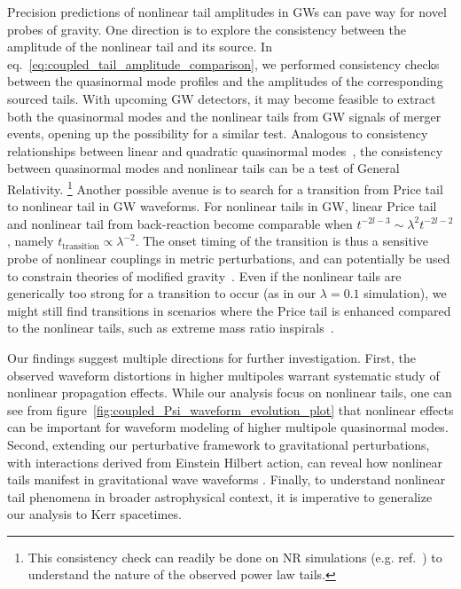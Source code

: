 \documentclass[reprint,aps,physrev,superscriptaddress,10pt,notitlepage,prd,nofootinbib,onecolumn]{revtex4-2}
\newcommand{\fref}[1]{figure~\ref{#1}}
\begin{document}
Precision predictions of nonlinear tail amplitudes in GWs can pave way for novel probes of gravity.
One direction is to explore the consistency between the amplitude of the nonlinear tail and its source.
In eq.~\eqref{eq:coupled_tail_amplitude_comparison}, we performed consistency checks between the quasinormal mode profiles and the amplitudes of the corresponding sourced tails.
With upcoming GW detectors, it may become feasible to extract both the quasinormal modes and the nonlinear tails from GW signals of merger events, opening up the possibility for a similar test.
Analogous to consistency relationships between linear and quadratic quasinormal modes~\cite{Khera:2023oyf,Khera:2024yrk,Cheung:2022rbm,Mitman:2022qdl,Ma:2024qcv,Perrone:2023jzq}, the consistency between quasinormal modes and nonlinear tails can be a test of General Relativity.
\footnote{This consistency check can readily be done on NR simulations (e.g. ref.~\cite{DeAmicis:2024eoy,Ma:2024hzq}) to understand the nature of the observed power law tails.}
Another possible avenue is to search for a transition from Price tail to nonlinear tail in GW waveforms.
For nonlinear tails in GW, linear Price tail and nonlinear tail from back-reaction become comparable when $t^{-2l-3} \sim \lambda^2 t^{-2l-2}$, namely $t_{\mathrm{transition}} \propto \lambda^{-2}$.
The onset timing of the transition is thus a sensitive probe of nonlinear couplings in metric perturbations, and can potentially be used to constrain theories of modified gravity~\cite{Berti:2015itd}.
Even if the nonlinear tails are generically too strong for a transition to occur (as in our $\lambda = 0.1$ simulation), we might still find transitions in scenarios where the Price tail is enhanced compared to the nonlinear tails, such as extreme mass ratio inspirals~\cite{Islam:2024vro,DeAmicis:2024not}.


Our findings suggest multiple directions for further investigation.
First, the observed waveform distortions in higher multipoles warrant systematic study of nonlinear propagation effects.
While our analysis focus on nonlinear tails, one can see from \fref{fig:coupled_Psi_waveform_evolution_plot} that nonlinear effects can be important for waveform modeling of higher multipole quasinormal modes.
Second, extending our perturbative framework to gravitational perturbations, with interactions derived from Einstein Hilbert action, can reveal how nonlinear tails manifest in gravitational wave waveforms \cite{Brizuela:2009qd}.
Finally, to understand nonlinear tail phenomena in broader astrophysical context, it is imperative to generalize our analysis to Kerr spacetimes.
\end{document}
